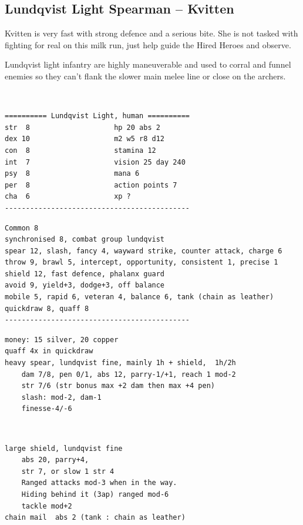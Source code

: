 \subsection*{Lundqvist Light Spearman -- Kvitten}

Kvitten is very fast with strong defence and a serious bite. She is not tasked with fighting for real on this milk run, just help guide the Hired Heroes and observe.

Lundqvist light infantry are highly maneuverable and used to corral and funnel enemies so they can't flank the slower main melee line or close on the archers.

\

\goodbreak \small \begin{samepage} \begin{verbatim}
========== Lundqvist Light, human ==========
str  8                    hp 20 abs 2
dex 10                    m2 w5 r8 d12
con  8                    stamina 12
int  7                    vision 25 day 240
psy  8                    mana 6
per  8                    action points 7
cha  6                    xp ?
--------------------------------------------
\end{verbatim} \goodbreak \begin{verbatim}
Common 8
synchronised 8, combat group lundqvist
spear 12, slash, fancy 4, wayward strike, counter attack, charge 6
throw 9, brawl 5, intercept, opportunity, consistent 1, precise 1
shield 12, fast defence, phalanx guard
avoid 9, yield+3, dodge+3, off balance
mobile 5, rapid 6, veteran 4, balance 6, tank (chain as leather)
quickdraw 8, quaff 8
--------------------------------------------
\end{verbatim} \goodbreak \begin{verbatim}
money: 15 silver, 20 copper
quaff 4x in quickdraw
heavy spear, lundqvist fine, mainly 1h + shield,  1h/2h
    dam 7/8, pen 0/1, abs 12, parry-1/+1, reach 1 mod-2
    str 7/6 (str bonus max +2 dam then max +4 pen)
    slash: mod-2, dam-1
    finesse-4/-6
\end{verbatim} \end{samepage}   \   \goodbreak \begin{samepage} \begin{verbatim}
large shield, lundqvist fine
    abs 20, parry+4,
    str 7, or slow 1 str 4
    Ranged attacks mod-3 when in the way.
    Hiding behind it (3ap) ranged mod-6
    tackle mod+2
chain mail  abs 2 (tank : chain as leather)
\end{verbatim} \end{samepage} \normalsize

